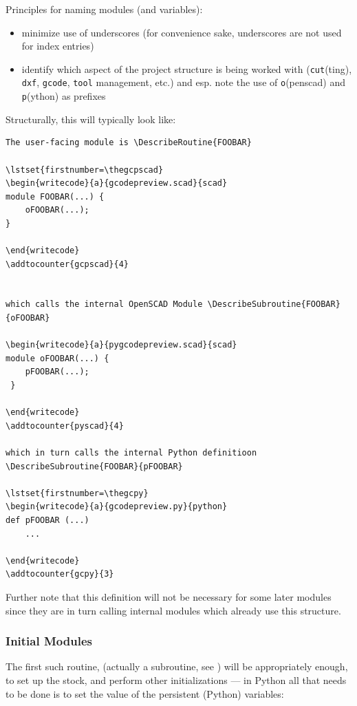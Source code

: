 \documentclass{ltxdoc}
\begin{document}
Principles for naming modules (and variables):

\begin{itemize}
\item minimize use of underscores (for convenience sake, underscores are not used for index entries)
\item identify which aspect of the project structure is being worked with (\texttt{cut}(ting), 
      \texttt{dxf}, \texttt{gcode}, \texttt{tool} management, etc.) and esp. note the use of
      \texttt{o}(penscad) and \texttt{p}(ython) as prefixes
\end{itemize}

Structurally, this will typically look like:

\begin{verbatim}
The user-facing module is \DescribeRoutine{FOOBAR}

\lstset{firstnumber=\thegcpscad}
\begin{writecode}{a}{gcodepreview.scad}{scad}
module FOOBAR(...) {
    oFOOBAR(...);
}

\end{writecode}
\addtocounter{gcpscad}{4}
 

which calls the internal OpenSCAD Module \DescribeSubroutine{FOOBAR}{oFOOBAR}

\begin{writecode}{a}{pygcodepreview.scad}{scad}
module oFOOBAR(...) {
    pFOOBAR(...);
 }
 
\end{writecode}
\addtocounter{pyscad}{4}

which in turn calls the internal Python definitioon \DescribeSubroutine{FOOBAR}{pFOOBAR}

\lstset{firstnumber=\thegcpy}
\begin{writecode}{a}{gcodepreview.py}{python}
def pFOOBAR (...)
    ...
    
\end{writecode}
\addtocounter{gcpy}{3}
\end{verbatim}

Further note that this definition will not be necessary for some later modules since they are
in turn calling internal modules which already use this structure.

\subsubsection{Initial Modules}

The first such routine, (actually a subroutine, see ) 
 will be appropriately enough, 
to set up the stock, and perform other initializations --- in Python all that needs 
to be done is to set the value of the persistent (Python) variables:
\end{document}
